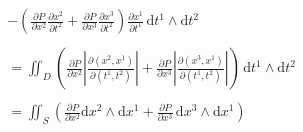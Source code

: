 \documentclass[a4paper,12pt]{article}
\begin{document}
\begin{CJK}{UTF8}{gbsn}
\[\begin{split}
        & -\left( \frac{\partial P}{\partial x^2}\frac{\partial x^2}{\partial t^2} 
        + \frac{\partial P}{\partial x^3}\frac{\partial x^3}{\partial t^2}\right)\frac{\partial x^1}{\partial t^1}
         \, \mathrm{d}{t^1}\wedge\mathrm{d}{t^2}\\\\
         & = \iint_D\left(\frac{\partial P}{\partial x^2}\left|
        \frac{\partial (x^2, x^1)}{\partial (t^1, t^2)}\right| + \frac{\partial P}{\partial x^3}
        \left|\frac{\partial (x^3, x^1)}{\partial (t^1, t^2)}\right| \right)
         \, \mathrm{d}{t^1}\wedge\mathrm{d}{t^2}\\\\
         & = \iint_S\left(\frac{\partial P}{\partial x^2}\mathrm{d}x^2
         \wedge \mathrm{d}x^1 + \frac{\partial P}{\partial x^3}
         \,\mathrm{d}x^3 \wedge \mathrm{d}x^1\right)
    \end{split}
\]
\end{CJK}
\end{document}
